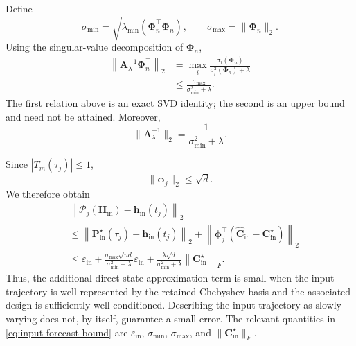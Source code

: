 Define
\begin{equation}
\sigma_{\min}
=
\sqrt{
\lambda_{\min}
\left(
\mathbf{\Phi}_n^\top
\mathbf{\Phi}_n
\right)
},
\qquad
\sigma_{\max}
=
\|\mathbf{\Phi}_n\|_2.
\end{equation}
Using the singular-value decomposition of $\mathbf{\Phi}_n$,
\begin{align}
\left\|
\mathbf{A}_\lambda^{-1}
\mathbf{\Phi}_n^\top
\right\|_2
&=
\max_i
\frac{
\sigma_i(\mathbf{\Phi}_n)
}{
\sigma_i^2(\mathbf{\Phi}_n)+\lambda
}
\nonumber\\
&\leq
\frac{
\sigma_{\max}
}{
\sigma_{\min}^2+\lambda
}.
\label{eq:input-ridge-operator-bound}
\end{align}
The first relation above is an exact SVD identity; the second is an
upper bound and need not be attained. Moreover,
\begin{equation}
\|\mathbf{A}_\lambda^{-1}\|_2
=
\frac{1}{\sigma_{\min}^2+\lambda}.
\label{eq:input-ridge-inverse-bound}
\end{equation}

Since $|T_m(\tau_j)|\leq1$,
\begin{equation}
\|\boldsymbol{\phi}_j\|_2
\leq
\sqrt{d}.
\label{eq:input-basis-bound}
\end{equation}
We therefore obtain
\begin{align}
&
\left\|
\mathcal{P}_j
\left(
\mathbf{H}_{\mathrm{in}}
\right)
-
\mathbf{h}_{\mathrm{in}}(t_j)
\right\|_2
\nonumber\\
&\leq
\left\|
\mathbf{P}_{\mathrm{in}}^\star(\tau_j)
-
\mathbf{h}_{\mathrm{in}}(t_j)
\right\|_2
+
\left\|
\boldsymbol{\phi}_j^\top
\left(
\widehat{\mathbf{C}}_{\mathrm{in}}
-
\mathbf{C}_{\mathrm{in}}^\star
\right)
\right\|_2
\nonumber\\
&\leq
\varepsilon_{\mathrm{in}}
+
\frac{
\sigma_{\max}\sqrt{nd}
}{
\sigma_{\min}^2+\lambda
}
\varepsilon_{\mathrm{in}}
+
\frac{
\lambda\sqrt{d}
}{
\sigma_{\min}^2+\lambda
}
\left\|
\mathbf{C}_{\mathrm{in}}^\star
\right\|_F.
\label{eq:input-forecast-bound}
\end{align}
Thus, the additional direct-state approximation term is small when the
input trajectory is well represented by the retained Chebyshev basis
and the associated design is sufficiently well conditioned. Describing
the input trajectory as slowly varying does not, by itself, guarantee a
small error. The relevant quantities in
\eqref{eq:input-forecast-bound} are
$\varepsilon_{\mathrm{in}}$,
$\sigma_{\min}$,
$\sigma_{\max}$, and
$\|\mathbf{C}_{\mathrm{in}}^\star\|_F$.

